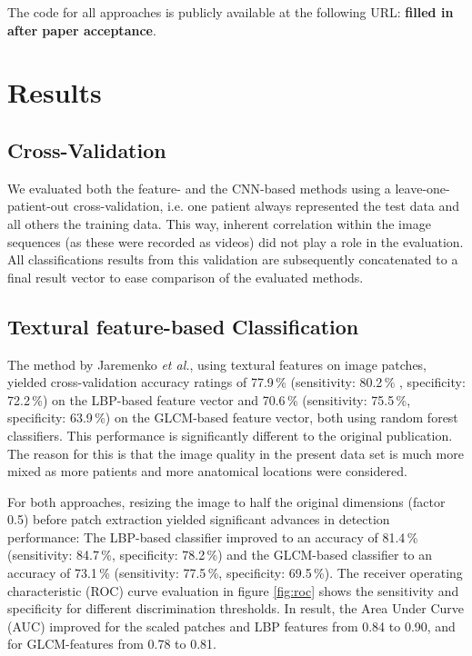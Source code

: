 \documentclass[fleqn,10pt]{wlscirep}
\begin{document}
The code for all approaches is publicly available at the following URL: \textbf{filled in after paper acceptance}.



\section{Results}


\subsection{Cross-Validation}

We evaluated both the feature- and the CNN-based methods using a leave-one-patient-out
cross-validation, i.e. one patient always represented the
test data and all others the training data. This way, inherent
correlation within the image sequences (as these were recorded as
videos) did not play a role in the evaluation. All classifications
results from this validation are subsequently concatenated to a final
result vector to ease comparison of the evaluated methods.

\subsection{Textural feature-based Classification}

The method by Jaremenko \textit{et al.}\cite{Jaremenko:2015kh}, using textural
features on image patches,
yielded cross-validation accuracy ratings of  77.9\,\% (sensitivity: 80.2\,\% , specificity: 72.2\,\%) on the LBP-based feature vector and
70.6\,\% (sensitivity: 75.5\,\%, specificity: 63.9\,\%) on the GLCM-based feature
vector, both using random forest classifiers. This performance is
significantly different to the original publication. The reason for
this is that the image quality in the present data set is much more
mixed as more patients and more anatomical locations were considered.


For both approaches,
resizing the image to half the original dimensions (factor 0.5)
before patch extraction yielded significant advances in detection
performance: The LBP-based classifier improved to an accuracy of
81.4\,\% (sensitivity: 84.7\,\%, specificity: 78.2\,\%) and the
GLCM-based classifier to an accuracy of 73.1\,\% (sensitivity: 77.5\,\%,
specificity: 69.5\,\%). The receiver operating characteristic (ROC) curve evaluation in figure
\ref{fig:roc} shows the sensitivity and specificity for different discrimination thresholds. In result, the Area Under Curve (AUC) improved for the scaled
patches and LBP features from 0.84 to 0.90, and for GLCM-features from
0.78 to 0.81.
\end{document}
